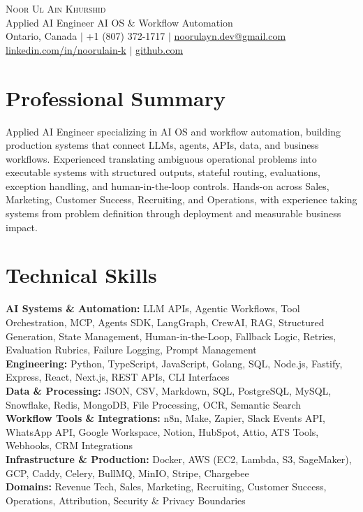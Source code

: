 \documentclass[letterpaper,10pt]{article}
\begin{document}
\begin{center}
    {\Huge \scshape Noor Ul Ain Khurshid} \\ \vspace{4pt}
    \small Applied AI Engineer \textbar{} AI OS \& Workflow Automation \\ \vspace{3pt}
    \small Ontario, Canada $|$ +1 (807) 372-1717 $|$
    \href{mailto:noorulayn.dev@gmail.com}{noorulayn.dev@gmail.com} \\ \vspace{2pt}
    \href{https://linkedin.com/in/noorulain-k}{linkedin.com/in/noorulain-k}
    $|$
    \href{https://github.com}{github.com}
\end{center}

\section{Professional Summary}
\small{
Applied AI Engineer specializing in AI OS and workflow automation, building production systems that connect LLMs, agents, APIs, data, and business workflows. Experienced translating ambiguous operational problems into executable systems with structured outputs, stateful routing, evaluations, exception handling, and human-in-the-loop controls. Hands-on across Sales, Marketing, Customer Success, Recruiting, and Operations, with experience taking systems from problem definition through deployment and measurable business impact.
}

\section{Technical Skills}
\begin{itemize}[leftmargin=0.15in, label={}]
    \small{\item{
        \textbf{AI Systems \& Automation:} LLM APIs, Agentic Workflows, Tool Orchestration, MCP, Agents SDK, LangGraph, CrewAI, RAG, Structured Generation, State Management, Human-in-the-Loop, Fallback Logic, Retries, Evaluation Rubrics, Failure Logging, Prompt Management \\
        \textbf{Engineering:} Python, TypeScript, JavaScript, Golang, SQL, Node.js, Fastify, Express, React, Next.js, REST APIs, CLI Interfaces \\
        \textbf{Data \& Processing:} JSON, CSV, Markdown, SQL, PostgreSQL, MySQL, Snowflake, Redis, MongoDB, File Processing, OCR, Semantic Search \\
        \textbf{Workflow Tools \& Integrations:} n8n, Make, Zapier, Slack Events API, WhatsApp API, Google Workspace, Notion, HubSpot, Attio, ATS Tools, Webhooks, CRM Integrations \\
        \textbf{Infrastructure \& Production:} Docker, AWS (EC2, Lambda, S3, SageMaker), GCP, Caddy, Celery, BullMQ, MinIO, Stripe, Chargebee \\
        \textbf{Domains:} Revenue Tech, Sales, Marketing, Recruiting, Customer Success, Operations, Attribution, Security \& Privacy Boundaries
    }}
\end{itemize}
\end{document}
